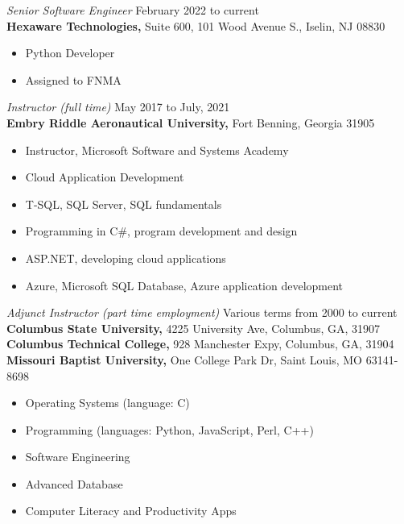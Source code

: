 \documentclass[margin, 10pt]{res} %
\begin{document}
\begin{resume}
 
{\it Senior Software Engineer} \hfill February 2022 to current \\
\textbf{Hexaware Technologies,} \hfill Suite 600, 101 Wood Avenue S., Iselin, NJ 08830
\begin{itemize} \itemsep -2pt %
            \footnotesize
\item Python Developer
\item Assigned to FNMA
\end{itemize}


{\it Instructor (full time)} \hfill May 2017 to July, 2021 \\
\textbf{Embry Riddle Aeronautical University,} \hfill Fort Benning, Georgia 31905 \\
\begin{itemize} \itemsep -2pt %
            \footnotesize
\item Instructor, Microsoft Software and Systems Academy
\item Cloud Application Development
\item T-SQL, SQL Server, SQL fundamentals
\item Programming in C\#, program development and design
\item ASP.NET, developing cloud applications
\item Azure, Microsoft SQL Database, Azure application development
\end{itemize}
 
{\it Adjunct Instructor (part time employment)} \hfill Various terms from 2000 to current \\
\textbf{Columbus State University,} \hfill 4225 University Ave, Columbus, GA, 31907 \\
\textbf{Columbus Technical College,} \hfill 928 Manchester Expy, Columbus, GA, 31904 \\
\textbf{Missouri Baptist University,} \hfill One College Park Dr, Saint Louis, MO 63141-8698
\begin{itemize} \itemsep -2pt %
            \footnotesize
\item Operating Systems (language: C)
\item Programming (languages: Python, JavaScript, Perl, C++)
\item Software Engineering
\item Advanced Database
\item Computer Literacy and Productivity Apps
\end{itemize}


\end{resume}
\end{document}
